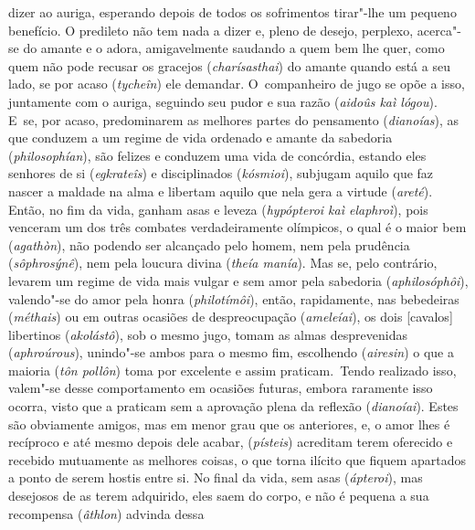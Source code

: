 dizer ao auriga, esperando depois de todos os sofrimentos tirar"-lhe um
pequeno benefício. \bekker{[256a]} O predileto não tem nada a dizer e, pleno
de desejo, perplexo, acerca"-se do amante e o adora, amigavelmente
saudando a quem bem lhe quer, como quem não pode recusar os gracejos
(\emph{charísasthai}) do amante quando está a seu lado, se por acaso
(\emph{tycheîn}) ele demandar. O~companheiro de jugo se opõe a isso,
juntamente com o auriga, seguindo seu pudor e sua razão (\emph{aidoûs
kaì lógou}). E~se, por acaso, predominarem as melhores partes do
pensamento (\emph{dianoías}), as que conduzem a um regime de vida
ordenado e amante da sabedoria (\emph{philosophían}), \bekker{[256b]} são
felizes e conduzem uma vida de concórdia, estando eles senhores de si
(\emph{egkrateîs}) e disciplinados (\emph{kósmioi}), subjugam aquilo que
faz nascer a maldade na alma e libertam aquilo que nela gera a virtude
(\emph{areté}). Então, no fim da vida, ganham asas e leveza
(\emph{hypópteroi kaì elaphroì}), pois venceram um dos três combates
verdadeiramente olímpicos, o qual é o maior bem (\emph{agathòn}), não
podendo ser alcançado pelo homem, nem pela prudência
(\emph{sôphrosýnê}), nem pela loucura divina (\emph{theía manía}). Mas
se, pelo contrário, levarem um regime de vida mais vulgar e sem amor
pela sabedoria (\emph{aphilosóphôi}), \bekker{[256c]} valendo"-se do amor pela
honra (\emph{philotímôi}), então, rapidamente, nas bebedeiras
(\emph{méthais}) ou em outras ocasiões de despreocupação
(\emph{ameleíai}), os dois [cavalos] libertinos (\emph{akolástô}),
sob o mesmo jugo, tomam as almas desprevenidas (\emph{aphroúrous}),
unindo"-se ambos para o mesmo fim, escolhendo (\emph{airesin}) o que a
maioria (\emph{tôn pollôn}) toma por excelente e assim praticam.~Tendo
realizado isso, valem"-se desse comportamento em ocasiões futuras, embora
raramente isso ocorra, visto que a praticam sem a aprovação plena da
reflexão (\emph{dianoíai}). Estes são obviamente amigos, mas em menor
grau que os anteriores, \bekker{[256d]} e, o amor lhes é recíproco e até
mesmo depois dele acabar, (\emph{písteis}) acreditam terem oferecido e
recebido mutuamente as melhores coisas, o que torna ilícito que fiquem
apartados a ponto de serem hostis entre si. No final da vida, sem asas
(\emph{ápteroi}), mas desejosos de as terem adquirido, eles saem do
corpo, e não é pequena a sua recompensa (\emph{âthlon}) advinda dessa
